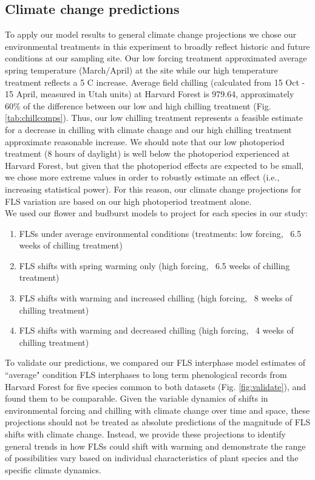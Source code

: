 \documentclass[11pt]{article}
\begin{document}
\subsection*{Climate change predictions}
\noindent To apply our model results to general climate change projections we chose our environmental treatments in this experiment to broadly reflect historic and future conditions at our sampling site. Our low forcing treatment approximated average spring temperature (March/April) at the site while our high temperature treatment reflects a 5 \degree C increase. Average field chilling (calculated from 15 Oct - 15 April, measured in Utah units) at Harvard Forest is 979.64, approximately 60\% of the difference between our low and high chilling treatment (Fig. \ref{tab:chillcomps}). Thus, our low chilling treatment represents a feasible estimate for a decrease in chilling with climate change and our high chilling treatment approximate reasonable increase. We should note that our low photoperiod treatment (8 hours of daylight) is well below the photoperiod experienced at Harvard Forest, but given that the photoperiod effects are expected to be small, we chose more extreme values in order to robustly estimate an effect (i.e., increasing statistical power). For this reason, our climate change projections for FLS variation are based on our high photoperiod treatment alone.\\

\noindent We used our flower and budburst models to project for each species in our study:\\
\begin{enumerate}
\item FLSs under average environmental conditions  (treatments: low forcing, ~6.5 weeks of chilling treatment)
\item FLS shifts with spring warming only (high forcing, ~6.5 weeks of chilling treatment)
\item FLS shifts with warming and increased chilling (high forcing, ~8 weeks of chilling treatment)
\item FLS shifts with warming and decreased chilling (high forcing, ~4 weeks of chilling treatment)

\end{enumerate}

\noindent To validate our predictions, we compared our FLS interphase model estimates of ``average" condition FLS interphases to long term phenological records from Harvard Forest \citep{OKeefe2015} for five species common to both datasets (Fig. \ref{fig:validate}), and found them to be comparable. Given the variable dynamics of shifts in environmental forcing and chilling with climate change over time and space, these projections should not be treated as absolute predictions of the magnitude of FLS shifts with climate change. Instead, we provide these projections to identify general trends in how FLSs could shift with warming and demonstrate the range of possibilities vary based on individual characteristics of plant species and the specific climate dynamics.\\
\end{document}

